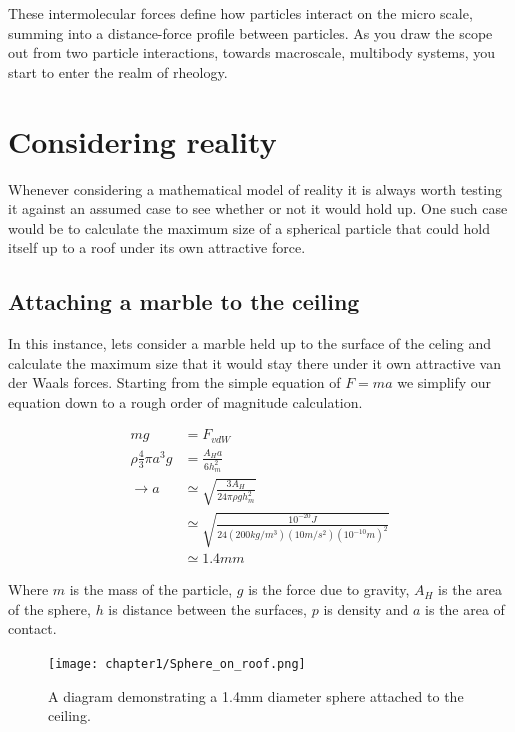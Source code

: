 These intermolecular forces define how particles interact on the micro scale, summing into a distance-force profile between particles. As you draw the scope out from two particle interactions, towards macroscale, multibody systems, you start to enter the realm of rheology.


\section{Considering reality}

Whenever considering a mathematical model of reality it is always worth testing it against an assumed case to see whether or not it would hold up. One such case would be to calculate the maximum size of a spherical particle that could hold itself up to a roof under its own attractive force.

\subsection{Attaching a marble to the ceiling}

In this instance, lets consider a marble held up to the surface of the celing and calculate the maximum size that it would stay there under it own attractive van der Waals forces. Starting from the simple equation of $F = ma$ we simplify our equation down to a rough order of magnitude calculation.

\begin{equation*}
    \begin{split}
    mg &= F_{vdW} \\
    \rho \frac{4}{3} \pi a^3 g &= \frac{A_H a}{6 h_{m}^2} \\
    \rightarrow a &\simeq \sqrt{\frac{3 A_H}{24 \pi \rho g h_{m}^2}} \\ 
    &\simeq \sqrt{\frac{10^{-20}J}{24 (200kg/m^3) (10m/s^2) (10^{-10} m)^2 }} \\
    &\simeq 1.4mm
    \end{split}
\end{equation*}
\newpage

Where $m$ is the mass of the particle, $g$ is the force due to gravity, $A_H$ is the area of the sphere, $h$ is distance between the surfaces, $p$ is density and $a$ is the area of contact.

\begin{figure}[h]     %
        \begin{center}
          \texttt{[image: chapter1/Sphere\_on\_roof.png]}
\end{center}
\caption{A diagram demonstrating a 1.4mm diameter sphere attached to the ceiling.}
\label{fig:disp}                 %
\end{figure}

